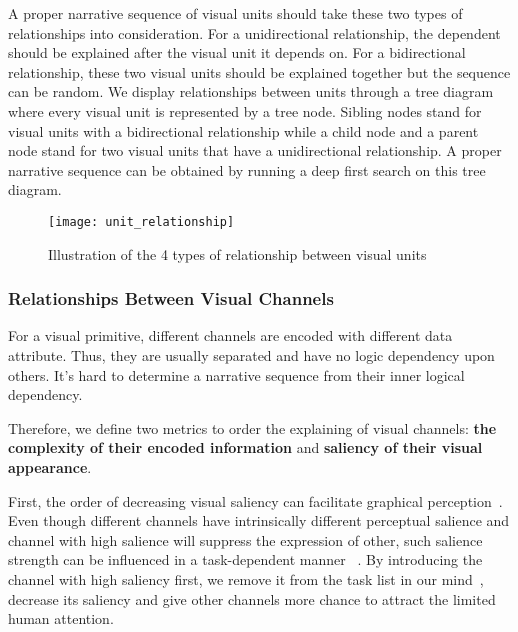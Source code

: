 A proper narrative sequence of visual units should take these two types of relationships into consideration. For a unidirectional relationship, the dependent should be explained after the visual unit it depends on. For a bidirectional relationship, these two visual units should be explained together but the sequence can be random. 
We display relationships between units through a tree diagram where every visual unit is represented by a tree node. Sibling nodes stand for visual units with a bidirectional relationship while a child node and a parent node stand for two visual units that have a unidirectional relationship. A proper narrative sequence can be obtained by running a deep first search on this tree diagram. 



\begin{figure}[tb]
 \centering %
 \texttt{[image: unit\_relationship]}
 \caption{Illustration of the 4 types of relationship between visual units}
 \label{fig:unit_relationship}
\end{figure}

\subsubsection{Relationships Between Visual Channels}
For a visual primitive, different channels are encoded with different data attribute. Thus, they are usually separated and have no logic dependency upon others. It's hard to determine a narrative sequence from their inner logical dependency. 

Therefore, we define two metrics to order the explaining of visual channels: \textbf{the complexity of their encoded information} and \textbf{saliency of their visual appearance}.

First, the order of decreasing visual saliency can facilitate graphical perception~\cite{cleveland_graphical_1984}. Even though different channels have intrinsically different perceptual salience and channel with high salience will suppress the expression of other, such salience strength can be influenced in a task-dependent manner ~\cite{nothdurft_salience_2000}. By introducing the channel with high saliency first, we remove it from the task list in our mind~\cite{itti2001computational}, decrease its saliency and give other channels more chance to attract the limited human attention. 

